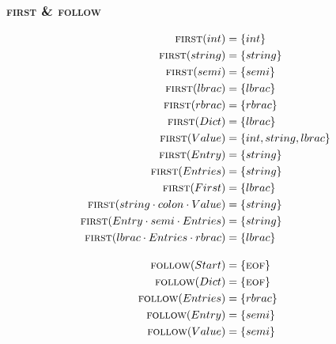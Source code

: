 \documentclass{report}
\newcommand{\Seq}{\cdot}
\newcommand{\FIRST}{\textsc{first}}
\newcommand{\FOLLOW}{\textsc{follow}}
\newcommand{\EOF}{\textsc{eof}}
\newcommand{\NT}[1]{{#1}}
\newcommand{\T}[1]{{#1}}
\begin{document}
    \subsubsection*{{\FIRST} \& {\FOLLOW}}
    \begin{equation*}
      \begin{aligned}
        \FIRST(\T{int}) &= \{\T{int}\}\\
        \FIRST(\T{string}) &= \{\T{string}\}\\
        \FIRST(\T{semi}) &= \{\T{semi}\}\\
        \FIRST(\T{lbrac}) &= \{\T{lbrac}\}\\
        \FIRST(\T{rbrac}) &= \{\T{rbrac}\}\\
        \FIRST(\NT{Dict}) &= \{\T{lbrac}\}\\
        \FIRST(\NT{Value}) &= \{\T{int}, \T{string}, \T{lbrac}\}\\
        \FIRST(\NT{Entry}) &= \{\T{string}\}\\
        \FIRST(\NT{Entries}) &= \{\T{string}\}\\
        \FIRST(\NT{First}) &= \{\T{lbrac}\}\\
        \FIRST(\T{string} \Seq \T{colon} \Seq \NT{Value}) &= \{\T{string}\}\\
        \FIRST(\NT{Entry} \Seq \T{semi} \Seq \NT{Entries}) &= \{\T{string}\}\\
        \FIRST(\T{lbrac} \Seq \NT{Entries} \Seq \T{rbrac}) &= \{\T{lbrac}\}\\[1em]
        \FOLLOW(\NT{Start}) &= \{\EOF\}\\
        \FOLLOW(\NT{Dict}) &= \{\EOF\}\\
        \FOLLOW(\NT{Entries}) &= \{\T{rbrac}\}\\
        \FOLLOW(\NT{Entry}) &= \{\T{semi}\}\\
        \FOLLOW(\NT{Value}) &= \{\T{semi}\}
      \end{aligned}
    \end{equation*}
\end{document}
